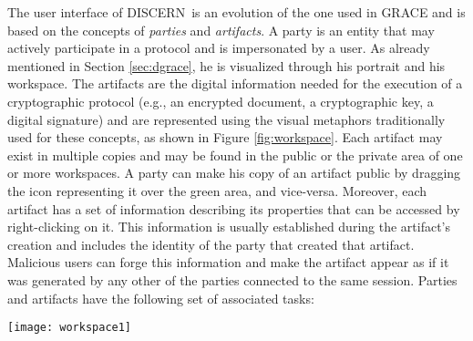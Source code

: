 \documentclass[conference]{IEEEtran}
\def\disgrace{DISCERN}
\begin{document}
The user interface of \disgrace\ is an evolution of the one used in GRACE and is based on the concepts of {\em
  parties} and {\em artifacts}. A party is an entity that may actively participate in a protocol and is
impersonated by a user. As already mentioned in Section
\ref{sec:dgrace}, he is visualized through his portrait and his
workspace. The artifacts are the digital information needed for the
execution of a cryptographic protocol (e.g., an encrypted document, a
cryptographic key, a digital signature) and are represented using the
visual metaphors traditionally used for these concepts, as shown in
Figure \ref{fig:workspace}. Each artifact may exist in multiple copies
and may be found in the public or the private area of one or more
workspaces.  A party can make his copy of an artifact public by dragging the icon
representing it over the green area, and vice-versa. Moreover, each
artifact has a set of information describing its properties that can
be accessed by right-clicking on it. This information is usually
established during the artifact's creation and includes the identity
of the party that created that artifact. Malicious users can forge
this information and make the artifact appear as if it was generated
by any other of the parties connected to the same session.  Parties
and artifacts have the following set of associated tasks:

\begin{figure*}
\centering
\texttt{[image: workspace1]}
\caption{The workspace of Alice. Her private area contains her RSA
  private key, Bob's RSA public key and an unencrypted document. Her
  public area contains her RSA public key and an encrypted copy of her
  document. She is now engaged in forging a new pair of cryptographic
  keys and, therefore, she is choosing the identity of the party to
  impersonate.}
\label{fig:workspace}
\end{figure*}
\end{document}
